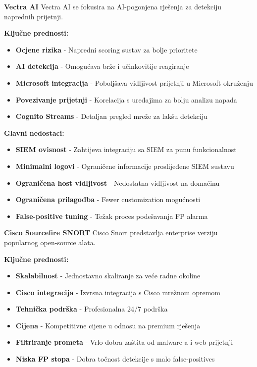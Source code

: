 \textbf{Vectra AI}
Vectra AI se fokusira na AI-pogonjena rješenja za detekciju naprednih prijetnji.

\textbf{Ključne prednosti:}
\begin{itemize}
\item \textbf{Ocjene rizika} - Napredni scoring sustav za bolje prioritete
\item \textbf{AI detekcija} - Omogućava brže i učinkovitije reagiranje
\item \textbf{Microsoft integracija} - Poboljšava vidljivost prijetnji u Microsoft okruženju
\item \textbf{Povezivanje prijetnji} - Korelacija s uređajima za bolju analizu napada
\item \textbf{Cognito Streams} - Detaljan pregled mreže za lakšu detekciju
\end{itemize}

\textbf{Glavni nedostaci:}
\begin{itemize}
\item \textbf{SIEM ovisnost} - Zahtijeva integraciju sa SIEM za punu funkcionalnost
\item \textbf{Minimalni logovi} - Ograničene informacije proslijeđene SIEM sustavu
\item \textbf{Ograničena host vidljivost} - Nedostatna vidljivost na domaćinu
\item \textbf{Ograničena prilagodba} - Fewer customization mogućnosti
\item \textbf{False-positive tuning} - Težak proces podešavanja FP alarma
\end{itemize}

\textbf{Cisco Sourcefire SNORT}
Cisco Snort predstavlja enterprise verziju popularnog open-source alata.

\textbf{Ključne prednosti:}
\begin{itemize}
\item \textbf{Skalabilnost} - Jednostavno skaliranje za veće radne okoline
\item \textbf{Cisco integracija} - Izvrsna integracija s Cisco mrežnom opremom
\item \textbf{Tehnička podrška} - Profesionalna 24/7 podrška
\item \textbf{Cijena} - Kompetitivne cijene u odnosu na premium rješenja
\item \textbf{Filtriranje prometa} - Vrlo dobra zaštita od malware-a i web prijetnji
\item \textbf{Niska FP stopa} - Dobra točnost detekcije s malo false-positives
\end{itemize}

